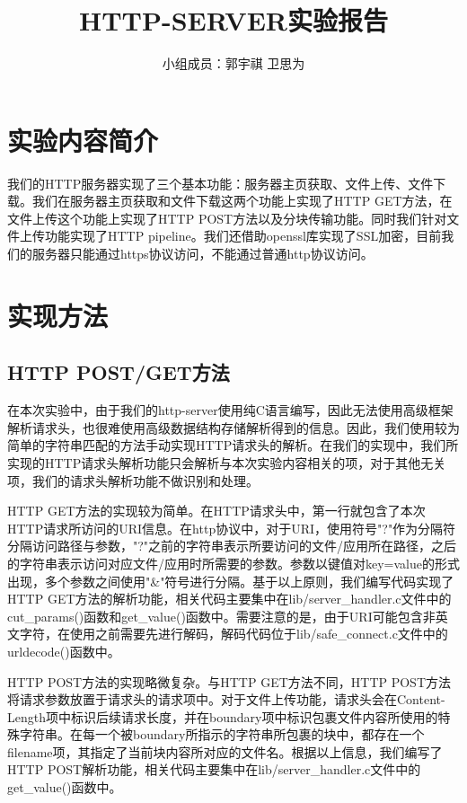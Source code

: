 \documentclass[a4paper]{article}
\begin{document}
 
\title{HTTP-SERVER实验报告}
\author{小组成员：郭宇祺 \; 卫思为}
\date{}
\maketitle
\normalsize
\section{实验内容简介}
我们的HTTP服务器实现了三个基本功能：服务器主页获取、文件上传、文件下载。我们在服务器主页获取和文件下载这两个功能上实现了HTTP GET方法，在文件上传这个功能上实现了HTTP POST方法以及分块传输功能。同时我们针对文件上传功能实现了HTTP pipeline。我们还借助openssl库实现了SSL加密，目前我们的服务器只能通过https协议访问，不能通过普通http协议访问。
\section{实现方法}
\subsection{HTTP POST/GET方法}
在本次实验中，由于我们的http-server使用纯C语言编写，因此无法使用高级框架解析请求头，也很难使用高级数据结构存储解析得到的信息。因此，我们使用较为简单的字符串匹配的方法手动实现HTTP请求头的解析。在我们的实现中，我们所实现的HTTP请求头解析功能只会解析与本次实验内容相关的项，对于其他无关项，我们的请求头解析功能不做识别和处理。

HTTP GET方法的实现较为简单。在HTTP请求头中，第一行就包含了本次HTTP请求所访问的URI信息。在http协议中，对于URI，使用符号"?"作为分隔符分隔访问路径与参数，"?"之前的字符串表示所要访问的文件/应用所在路径，之后的字符串表示访问对应文件/应用时所需要的参数。参数以键值对key=value的形式出现，多个参数之间使用"\&"符号进行分隔。基于以上原则，我们编写代码实现了HTTP GET方法的解析功能，相关代码主要集中在lib/server\_handler.c文件中的cut\_params()函数和get\_value()函数中。需要注意的是，由于URI可能包含非英文字符，在使用之前需要先进行解码，解码代码位于lib/safe\_connect.c文件中的urldecode()函数中。

HTTP POST方法的实现略微复杂。与HTTP GET方法不同，HTTP POST方法将请求参数放置于请求头的请求项中。对于文件上传功能，请求头会在Content-Length项中标识后续请求长度，并在boundary项中标识包裹文件内容所使用的特殊字符串。在每一个被boundary所指示的字符串所包裹的块中，都存在一个filename项，其指定了当前块内容所对应的文件名。根据以上信息，我们编写了HTTP POST解析功能，相关代码主要集中在lib/server\_handler.c文件中的get\_value()函数中。
\end{document}
